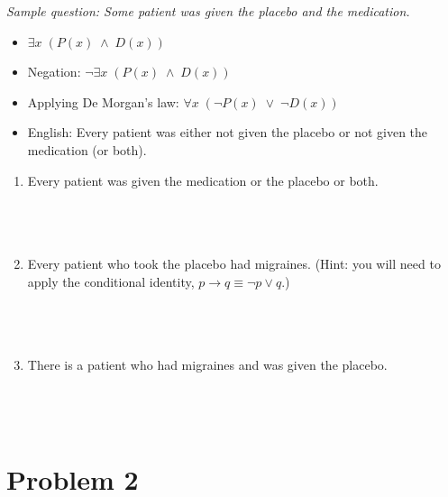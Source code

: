 \documentclass{amsart}
\theoremstyle{definition}
\theoremstyle{Exercise}
\theoremstyle{remark}
\theoremstyle{rule}
\numberwithin{equation}{section}
\begin{document}
{\it
Sample question: Some patient was given the placebo and the medication.\\
\begin{itemize}
  \item $\exists x\; (P(x)\; \land \; D(x))$\\
  \item Negation: $\neg \exists x\; (P(x)\; \land \; D(x))$\\
  \item Applying De Morgan's law: $\forall x\; (\neg P(x)\; \lor \; \neg D(x))$\\
  \item English: Every patient was either not given the placebo or not given the medication (or both).\\
\end{itemize}
}
\newpage

\begin{enumerate}[label=(\alph*)]

\item Every patient was given the medication or the placebo or both.\\\\
\\\\

\item Every patient who took the placebo had migraines. (Hint: you will need to apply the conditional identity, $p \to q \equiv \neg p \lor q$.)\\\\
\\\\
\item There is a patient who had migraines and was given the placebo.\\\\
\\\\
\end{enumerate}

\newpage


\section*{Problem 2}
\end{document}
